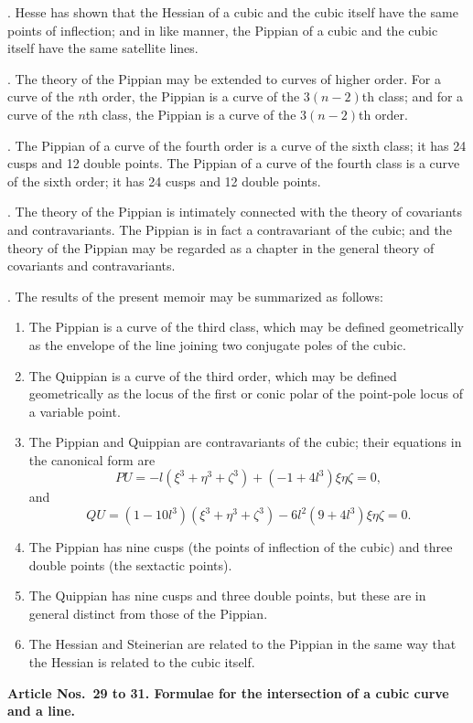 \documentclass[12pt,a4paper]{article}
\theoremstyle{definition}
\begin{document}
. Hesse has shown that the Hessian of a cubic and the
cubic itself have the same points of inflection; and in like
manner, the Pippian of a cubic and the cubic itself have the
same satellite lines.

. The theory of the Pippian may be extended to curves
of higher order. For a curve of the $n$th order, the Pippian
is a curve of the $3(n-2)$th class; and for a curve of the $n$th
class, the Pippian is a curve of the $3(n-2)$th order.

. The Pippian of a curve of the fourth order is a curve
of the sixth class; it has 24 cusps and 12 double points. The
Pippian of a curve of the fourth class is a curve of the sixth
order; it has 24 cusps and 12 double points.

. The theory of the Pippian is intimately connected with
the theory of covariants and contravariants. The Pippian is
in fact a contravariant of the cubic; and the theory of the
Pippian may be regarded as a chapter in the general theory of
covariants and contravariants.

. The results of the present memoir may be summarized
as follows:
\begin{enumerate}
\item The Pippian is a curve of the third class, which may be
defined geometrically as the envelope of the line joining two
conjugate poles of the cubic.
\item The Quippian is a curve of the third order, which may be
defined geometrically as the locus of the first or conic polar of
the point-pole locus of a variable point.
\item The Pippian and Quippian are contravariants of the cubic;
their equations in the canonical form are
\[PU = -l(\xi^{3} + \eta^{3} + \zeta^{3}) + (-1 + 4l^{3})\xi\eta\zeta = 0,\]
and
\[QU = (1 - 10l^{3})(\xi^{3} + \eta^{3} + \zeta^{3}) - 6l^{2}(9 + 4l^{3})\xi\eta\zeta = 0.\]
\item The Pippian has nine cusps (the points of inflection of the
cubic) and three double points (the sextactic points).
\item The Quippian has nine cusps and three double points, but
these are in general distinct from those of the Pippian.
\item The Hessian and Steinerian are related to the Pippian in
the same way that the Hessian is related to the cubic itself.
\end{enumerate}

\medskip\noindent\textbf{Article Nos.~29 to 31. Formulae for the intersection of a
cubic curve and a line.}
\end{document}
